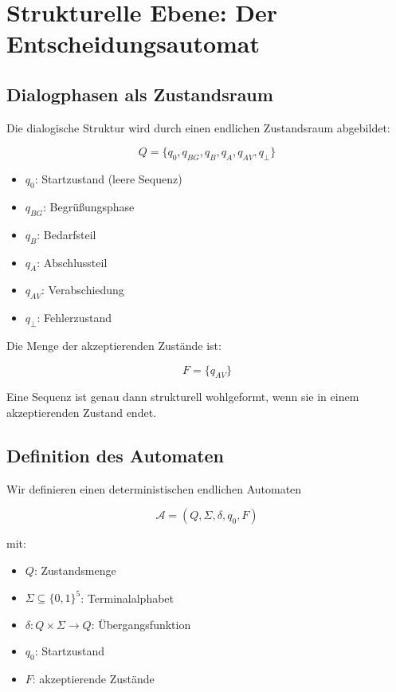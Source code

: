 \documentclass[
  12pt,
  a4paper,
  oneside,
  titlepage
]{article}
\begin{document}
\section{Strukturelle Ebene: Der Entscheidungsautomat}

\subsection{Dialogphasen als Zustandsraum}

Die dialogische Struktur wird durch einen endlichen Zustandsraum abgebildet:

\[
Q = \{q_0, q_{BG}, q_B, q_A, q_{AV}, q_\bot\}
\]

\begin{itemize}
    \item \(q_0\): Startzustand (leere Sequenz)
    \item \(q_{BG}\): Begrüßungsphase
    \item \(q_B\): Bedarfsteil
    \item \(q_A\): Abschlussteil
    \item \(q_{AV}\): Verabschiedung
    \item \(q_\bot\): Fehlerzustand
\end{itemize}

Die Menge der akzeptierenden Zustände ist:

\[
F = \{q_{AV}\}
\]

Eine Sequenz ist genau dann strukturell wohlgeformt, wenn sie in einem 
akzeptierenden Zustand endet.

\subsection{Definition des Automaten}

Wir definieren einen deterministischen endlichen Automaten

\[
\mathcal{A} = (Q, \Sigma, \delta, q_0, F)
\]

mit:
\begin{itemize}
    \item \(Q\): Zustandsmenge
    \item \(\Sigma \subseteq \{0,1\}^5\): Terminalalphabet
    \item \(\delta: Q \times \Sigma \to Q\): Übergangsfunktion
    \item \(q_0\): Startzustand
    \item \(F\): akzeptierende Zustände
\end{itemize}
\end{document}
